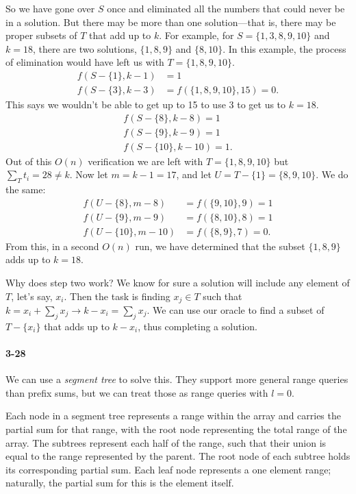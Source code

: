 \documentclass{report}
\begin{document}
So we have gone over $S$ once and eliminated all the numbers that could never be in a solution. But there may be more than one solution---that is, there may be proper subsets of $T$ that add up to $k$. For example, for $S=\{1,3,8,9,10\}$ and $k=18$, there are two solutions, $\{1,8,9\}$ and $\{8,10\}$. In this example, the process of elimination would have left us with $T=\{1,8,9,10\}$.
\begin{align*}
	f(S-\{1\}, k-1) &= 1 \\
	f(S-\{3\}, k-3) &= f(\{1,8,9,10\}, 15) = 0.
\end{align*}
This says we wouldn't be able to get up to 15 to use 3 to get us to $k=18$.
\begin{align*}
	f(S-\{8\}, k-8) = 1 \\
	f(S-\{9\}, k-9) = 1 \\
	f(S-\{10\}, k-10) = 1.
\end{align*}
Out of this $O(n)$ verification we are left with $T=\{1,8,9,10\}$ but $\sum_T t_i = 28 \ne k$. Now let $m=k-1=17$, and let $U=T-\{1\}=\{8,9,10\}$. We do the same:
\begin{align*}
	f(U-\{8\}, m-8) &= f(\{9,10\}, 9) = 1 \\
	f(U-\{9\}, m-9) &= f(\{8,10\}, 8) = 1 \\
	f(U-\{10\}, m-10) &= f(\{8,9\}, 7) = 0.
\end{align*}
From this, in a second $O(n)$ run, we have determined that the subset $\{1,8,9\}$ adds up to $k=18$.

Why does step two work? We know for sure a solution will include any element of $T$, let's say, $x_i$. Then the task is finding $x_j\in T$ such that $k = x_i + \sum_j x_j \to k-x_i = \sum_j x_j$. We can use our oracle to find a subset of $T-\{x_i\}$ that adds up to $k-x_i$, thus completing a solution.

\paragraph{3-28} We can use a \emph{segment tree} to solve this. They support more general range queries than prefix sums, but we can treat those as range queries with $l=0$.

Each node in a segment tree represents a range within the array and carries the partial sum for that range, with the root node representing the total range of the array. The subtrees represent each half of the range, such that their union is equal to the range represented by the parent. The root node of each subtree holds its corresponding partial sum. Each leaf node represents a one element range; naturally, the partial sum for this is the element itself.
\end{document}
